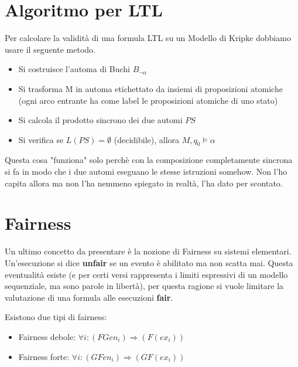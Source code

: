 \section{Algoritmo per LTL}

Per calcolare la validit\`a di una formula LTL su un Modello di Kripke dobbiamo usare il seguente metodo.

\begin{itemize}
  \item Si costruisce l'automa di Buchi $B_{\neg \alpha}$
  \item Si trasforma M in automa etichettato da insiemi di proposizioni atomiche (ogni arco entrante ha come label le proposizioni atomiche di uno stato)
  \item Si calcola il prodotto sincrono dei due automi $PS$
  \item Si verifica se $L(PS) = \emptyset$ (decidibile), allora $M,q_0 \models \alpha$
\end{itemize}

Questa cosa "funziona" solo perch\`e con la composizione completamente sincrona si fa in modo che i due automi eseguano le stesse istruzioni somehow. Non l'ho capita allora ma non l'ha nemmeno spiegato in realt\`a, l'ha dato per scontato.

\section{Fairness}

Un ultimo concetto da presentare \`e la nozione di Fairness su sistemi elementari. Un'esecuzione si dice \textbf{unfair} se un evento \`e abilitato ma non scatta mai. Questa eventualit\`a esiste (e per certi versi rappresenta i limiti espressivi di un modello sequenziale, ma sono parole in libert\`a), per questa ragione si vuole limitare la valutazione di una formula alle esecuzioni \textbf{fair}.

Esistono due tipi di fairness:

\begin{itemize}
  \item Fairness debole: $\forall i : (FGen_i) \Rightarrow (F(ex_i))$
  \item Fairness forte: $\forall i : (GFen_i) \Rightarrow (GF(ex_i))$ 
\end{itemize}
